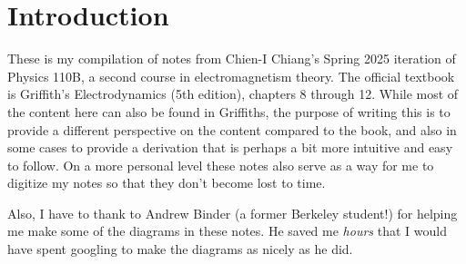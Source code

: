 \section*{Introduction}
These is my compilation of notes from Chien-I Chiang's Spring 2025 iteration of Physics 110B, a second course
in electromagnetism theory. The official textbook is Griffith's Electrodynamics (5th edition), chapters 8
through 12. While most of the content here can also be found in Griffiths, the purpose of writing this is to
provide a different perspective on the content compared to the book, and also in some cases to provide a
derivation that is perhaps a bit more intuitive and easy to follow. On a more personal level 
these notes also serve as a way for me to digitize my notes so that they don't become lost to time.
 
Also, I have to thank to Andrew Binder (a former Berkeley student!) for helping me make some of the diagrams
in these notes. He saved me \textit{hours} that I would have spent googling to make the diagrams as nicely as
he did.     
 


